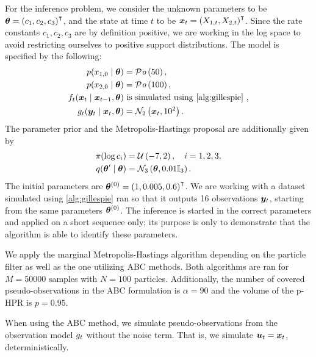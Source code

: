 For the inference problem, we consider the unknown parameters to be $\bm{\theta} = \left(c_1, c_2, c_3\right)^\intercal$, and the state at time $t$ to be $\bm{x}_t = \left(X_{1,t}, X_{2,t}\right)^\intercal$. Since the rate constants $c_1, c_2, c_3$ are by definition positive, we are working in the log space to avoid restricting ourselves to positive support distributions. The model is specified by the following:
\begin{equation*}
\begin{split}
\sprior(x_{1,0} \mid \btheta) &= \mathcal{P}\mathit{o}\left(50\right), \\
\sprior(x_{2,0} \mid \btheta) &= \mathcal{P}\mathit{o}\left(100\right), \\
\trans_t(\bx_t \mid \bx_{t-1}, \btheta) & \text{ is simulated using \autoref{alg:gillespie} }, \\
\obs_t(\by_t \mid \bx_{t}, \btheta) &= \mathcal{N}_2\left(\bx_t, 10^2\right).
\end{split}
\end{equation*}
The parameter prior and the Metropolis-Hastings proposal are additionally given by
\begin{equation*}
\begin{split}
\pi(\log c_i) &= \mathcal{U}\left(-7, 2\right), \quad i = 1, 2, 3, \\
q(\bm{\theta}^\prime \mid \bm{\theta}) &= \mathcal{N}_3\left(\bm{\theta}, 0.01 \mathbb{I}_3\right).
\end{split}
\end{equation*}
The initial parameters are $\bm{\theta}^{(0)} = \left(1, 0.005, 0.6\right)^\intercal$. We are working with a dataset simulated using \autoref{alg:gillespie} ran so that it outputs 16 observations $\bm{y}_t$, starting from the same parameters $\bm{\theta}^{(0)}$. The inference is started in the correct parameters and applied on a short sequence only; its purpose is only to demonstrate that the algorithm is able to identify these parameters.

We apply the marginal Metropolis-Hastings algorithm depending on the particle filter as well as the one utilizing ABC methods. Both algorithms are ran for $M = 50000$ samples with $N = 100$ particles. Additionally, the number of covered pseudo-observations in the ABC formulation is $\alpha = 90$ and the volume of the p-HPR is $p = 0.95$.

When using the ABC method, we simulate pseudo-observations from the observation model $g_t$ without the noise term. That is, we simulate $\bm{u}_t = \bm{x}_t$, deterministically.

